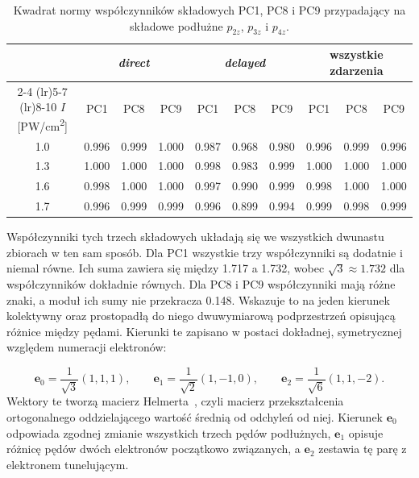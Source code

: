 \documentclass[12pt,a4paper]{article}
\newcommand{\PWcm}{PW/cm\textsuperscript{2}}
\begin{document}
\begin{table}[h!]
\centering
\small
\setlength{\tabcolsep}{4pt}
\caption{Kwadrat normy współczynników składowych PC1, PC8 i PC9
przypadający na składowe podłużne $p_{2z}$, $p_{3z}$ i $p_{4z}$.}
\label{tab:pca_podluzne}
\begin{tabular}{c ccc ccc ccc}
\toprule
& \multicolumn{3}{c}{\emph{direct}}
& \multicolumn{3}{c}{\emph{delayed}}
& \multicolumn{3}{c}{wszystkie zdarzenia} \\
\cmidrule(lr){2-4}
\cmidrule(lr){5-7}
\cmidrule(lr){8-10}
$I$ [\PWcm]
& PC1 & PC8 & PC9
& PC1 & PC8 & PC9
& PC1 & PC8 & PC9 \\
\midrule
\num{1.0}
& \num{0.996} & \num{0.999} & \num{1.000}
& \num{0.987} & \num{0.968} & \num{0.980}
& \num{0.996} & \num{0.999} & \num{0.996} \\
\num{1.3}
& \num{1.000} & \num{1.000} & \num{1.000}
& \num{0.998} & \num{0.983} & \num{0.999}
& \num{1.000} & \num{1.000} & \num{1.000} \\
\num{1.6}
& \num{0.998} & \num{1.000} & \num{1.000}
& \num{0.997} & \num{0.990} & \num{0.999}
& \num{0.998} & \num{1.000} & \num{1.000} \\
\num{1.7}
& \num{0.996} & \num{0.999} & \num{0.999}
& \num{0.996} & \num{0.899} & \num{0.994}
& \num{0.999} & \num{0.998} & \num{0.999} \\
\bottomrule
\end{tabular}
\end{table}


Współczynniki tych trzech składowych układają się we wszystkich
dwunastu zbiorach w ten sam sposób. Dla PC1 wszystkie trzy
współczynniki są dodatnie i niemal równe. Ich suma zawiera się
między \num{1.717} a \num{1.732}, wobec $\sqrt3\approx\num{1.732}$
dla współczynników dokładnie równych. Dla PC8 i PC9 współczynniki
mają różne znaki, a moduł ich sumy nie przekracza \num{0.148}.
Wskazuje to na jeden kierunek kolektywny oraz prostopadłą do niego
dwuwymiarową podprzestrzeń opisującą różnice między pędami.
Kierunki te zapisano w postaci dokładnej, symetrycznej względem
numeracji elektronów:

\begin{equation}
\mathbf{e}_0=\frac{1}{\sqrt3}(1,1,1),\qquad
\mathbf{e}_1=\frac{1}{\sqrt2}(1,-1,0),\qquad
\mathbf{e}_2=\frac{1}{\sqrt6}(1,1,-2).
\label{eq:baza}
\end{equation}
Wektory te tworzą macierz Helmerta~\cite{Lancaster1965},
czyli macierz
przekształcenia ortogonalnego oddzielającego wartość średnią od
odchyleń od niej. Kierunek $\mathbf{e}_0$ odpowiada zgodnej zmianie wszystkich
trzech pędów podłużnych, $\mathbf{e}_1$ opisuje różnicę pędów dwóch
elektronów początkowo związanych, a $\mathbf{e}_2$ zestawia tę parę
z elektronem tunelującym.
\end{document}
